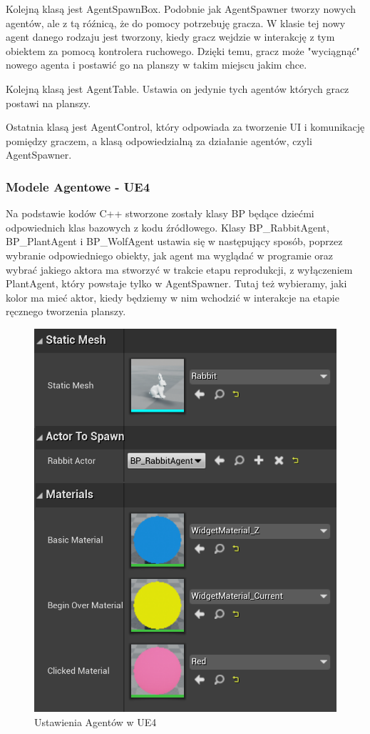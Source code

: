 \documentclass[a4paper,12pt,reqno]{article}
\begin{document}
Kolejną klasą jest AgentSpawnBox. Podobnie jak AgentSpawner tworzy nowych agentów, ale z tą róźnicą, że do pomocy potrzebuję gracza. W klasie tej nowy agent danego rodzaju jest tworzony, kiedy gracz wejdzie w interakcję z tym obiektem za pomocą kontrolera ruchowego. Dzięki temu, gracz może "wyciągnąć" nowego agenta i postawić go na planszy w takim miejscu jakim chce. 

Kolejną klasą jest AgentTable. Ustawia on jedynie tych agentów których gracz postawi na planszy.

Ostatnia klasą jest AgentControl, który odpowiada za tworzenie UI i komunikację pomiędzy graczem, a klasą odpowiedzialną za działanie agentów, czyli AgentSpawner. 

\subsubsection{Modele Agentowe - UE4}

Na podstawie kodów C++ stworzone zostały klasy BP będące dziećmi odpowiednich klas bazowych z kodu źródłowego. Klasy BP\_RabbitAgent, BP\_PlantAgent i BP\_WolfAgent ustawia się w następujący sposób, poprzez wybranie odpowiedniego obiekty, jak agent ma wyglądać w programie oraz wybrać jakiego aktora ma stworzyć w trakcie etapu reprodukcji, z wyłączeniem PlantAgent, który powstaje tylko w AgentSpawner. Tutaj też wybieramy, jaki kolor ma mieć aktor, kiedy będziemy w nim wchodzić w interakcje na etapie ręcznego tworzenia planszy.

\begin{figure}[H]%
\centering
\includegraphics[width=0.5\columnwidth]{graphics//agent/BP_AgentActor.png}
\caption{Ustawienia Agentów w UE4 
\label{BPExample}}%
%
\qquad
\end{figure} 
\end{document}
